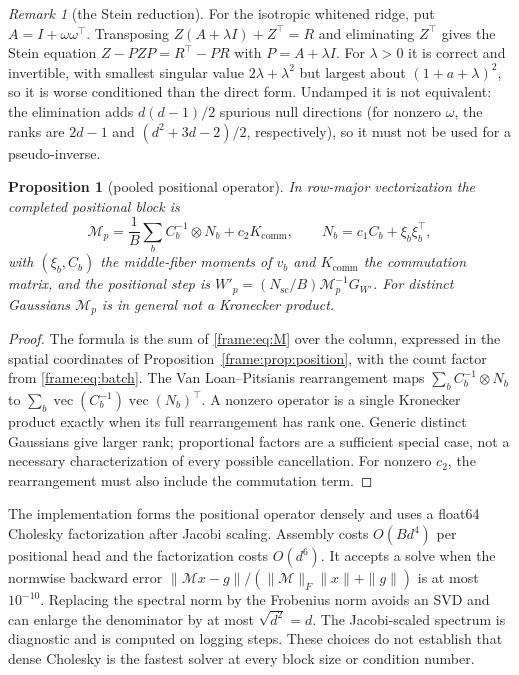 \documentclass[11pt]{article}
\newtheorem{proposition}[theorem]{Proposition}
\theoremstyle{definition}
\theoremstyle{remark}
\newtheorem{remark}[theorem]{Remark}
\providecommand{\vect}{\operatorname{vec}}
\providecommand{\Nsc}{N_{\mathrm{sc}}}
\begin{document}
\begin{remark}[the Stein reduction]\label{frame:rem:stein}
For the isotropic whitened ridge, put $A=I+\omega\omega^\top$. Transposing $Z(A+\lambda I)+Z^\top=R$ and eliminating $Z^\top$ gives the Stein equation $Z-PZP=R^\top-PR$ with $P=A+\lambda I$. For $\lambda>0$ it is correct and invertible, with smallest singular value $2\lambda+\lambda^2$ but largest about $(1+a+\lambda)^2$, so it is worse conditioned than the direct form. Undamped it is not equivalent: the elimination adds $d(d-1)/2$ spurious null directions (for nonzero $\omega$, the ranks are $2d-1$ and $(d^2+3d-2)/2$, respectively), so it must not be used for a pseudo-inverse.
\end{remark}

\begin{proposition}[pooled positional operator]\label{frame:prop:pooled}
In row-major vectorization the completed positional block is
\begin{equation}\label{frame:eq:pooled}
\mathcal{M}_p=\frac1B\sum_bC_b^{-1}\otimes N_b+c_2K_{\mathrm{comm}},\qquad N_b=c_1C_b+\xi_b\xi_b^\top,
\end{equation}
with $(\xi_b,C_b)$ the middle-fiber moments of $v_b$ and $K_{\mathrm{comm}}$ the commutation matrix, and the positional step is $W'_p=(\Nsc/B)\mathcal{M}_p^{-1}G_{W'}$. For distinct Gaussians $\mathcal{M}_p$ is in general not a Kronecker product.
\end{proposition}
\begin{proof}
The formula is the sum of \eqref{frame:eq:M} over the column, expressed in the spatial coordinates of Proposition~\ref{frame:prop:position}, with the count factor from \eqref{frame:eq:batch}. The Van Loan--Pitsianis rearrangement \cite{frame:VanLoanPitsianis1993} maps \(\sum_b C_b^{-1}\otimes N_b\) to \(\sum_b\vect(C_b^{-1})\vect(N_b)^\top\). A nonzero operator is a single Kronecker product exactly when its full rearrangement has rank one. Generic distinct Gaussians give larger rank; proportional factors are a sufficient special case, not a necessary characterization of every possible cancellation. For nonzero \(c_2\), the rearrangement must also include the commutation term.
\end{proof}

The implementation forms the positional operator densely and uses a float64 Cholesky factorization after Jacobi scaling. Assembly costs \(O(Bd^4)\) per positional head and the factorization costs \(O(d^6)\). It accepts a solve when the normwise backward error \(\|\mathcal Mx-g\|/(\|\mathcal M\|_F\|x\|+\|g\|)\) is at most \(10^{-10}\). Replacing the spectral norm by the Frobenius norm avoids an SVD and can enlarge the denominator by at most \(\sqrt{d^2}=d\). The Jacobi-scaled spectrum is diagnostic and is computed on logging steps. These choices do not establish that dense Cholesky is the fastest solver at every block size or condition number.
\end{document}
